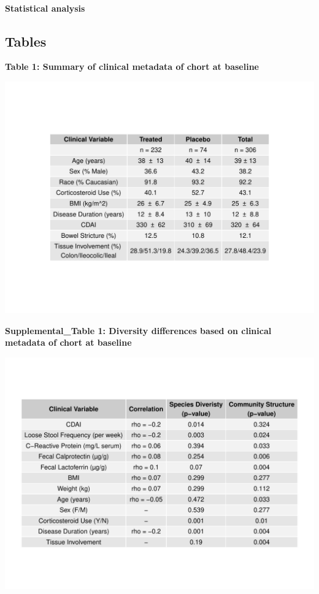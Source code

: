 \documentclass[11pt,]{article}
\let\oldparagraph\paragraph
\renewcommand{\paragraph}[1]{\oldparagraph{#1}\mbox{}}
\begin{document}
\paragraph{Statistical analysis}\label{statistical-analysis}

\newpage

\subsection{Tables}\label{tables}

\textbf{Table 1: Summary of clinical metadata of chort at baseline}

\includegraphics{tables/SupTable1_baseline_metadata.pdf}

\newpage

\textbf{Supplemental\_Table 1: Diversity differences based on clinical
metadata of chort at baseline}

\includegraphics{tables/table1_cohortdiversity.pdf}
\end{document}
